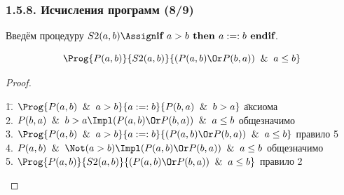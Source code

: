 \begin{frame}
\frametitle{1.5.8. Исчисления программ (8/9)}

Введём процедуру $S2(a,b) \Assign \textbf{if } a > b \textbf{ then } a :=: b \textbf{ endif}$.

\[
\Prog{P(a,b)}{S2(a,b)}{(P(a,b) \Or P(b,a)) \And a \leq b}
\]

\begin{proof}
\begin{tabbing}
1.\= $\Prog{P(a,b) \And a > b}{a :=: b}{P(b,a) \And b > a}$ \quad\= аксиома \\[2pt]
2.\> $P(b,a) \And b > a \Impl (P(a,b) \Or P(b,a)) \And a \leq b$ \> общезначимо \\[2pt]
3.\> $\Prog{P(a,b) \And a > b}{a :=: b}{(P(a,b) \Or P(b,a)) \And a \leq b}$ \> правило 5 \\[2pt]
4.\> $P(a,b) \And \Not(a > b) \Impl (P(a,b) \Or P(b,a)) \And a \leq b$ \> общезначимо \\[2pt]
5.\> $\Prog{P(a,b)}{S2(a,b)}{(P(a,b) \Or P(b,a)) \And a \leq b}$ \> правило 2
\end{tabbing}
\end{proof}

\end{frame}


